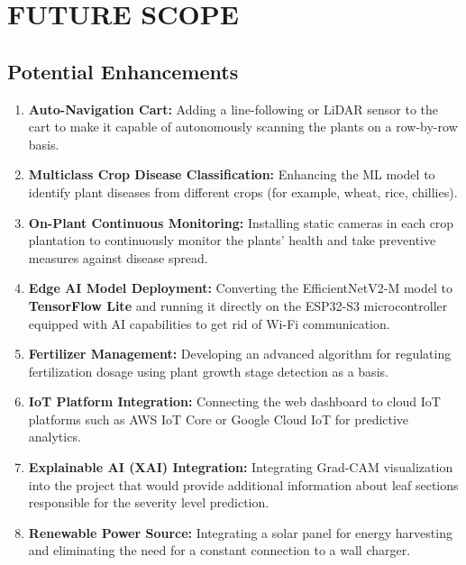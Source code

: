 \documentclass[12pt,a4paper,oneside]{report}
\begin{document}
\chapter{FUTURE SCOPE}

\section{Potential Enhancements}

\begin{enumerate}[leftmargin=2em]
    \item \textbf{Auto-Navigation Cart:} Adding a line-following or LiDAR sensor to the cart to make it capable of autonomously scanning the plants on a row-by-row basis.

    \item \textbf{Multiclass Crop Disease Classification:} Enhancing the ML model to identify plant diseases from different crops (for example, wheat, rice, chillies).

    \item \textbf{On-Plant Continuous Monitoring:} Installing static cameras in each crop plantation to continuously monitor the plants' health and take preventive measures against disease spread.

    \item \textbf{Edge AI Model Deployment:} Converting the EfficientNetV2-M model to \textbf{TensorFlow Lite} and running it directly on the ESP32-S3 microcontroller equipped with AI capabilities to get rid of Wi-Fi communication.

    \item \textbf{Fertilizer Management:} Developing an advanced algorithm for regulating fertilization dosage using plant growth stage detection as a basis.

    \item \textbf{IoT Platform Integration:} Connecting the web dashboard to cloud IoT platforms such as AWS IoT Core or Google Cloud IoT for predictive analytics.

    \item \textbf{Explainable AI (XAI) Integration:} Integrating Grad-CAM visualization into the project that would provide additional information about leaf sections responsible for the severity level prediction.

    \item \textbf{Renewable Power Source:} Integrating a solar panel for energy harvesting and eliminating the need for a constant connection to a wall charger.
\end{enumerate}
\end{document}
